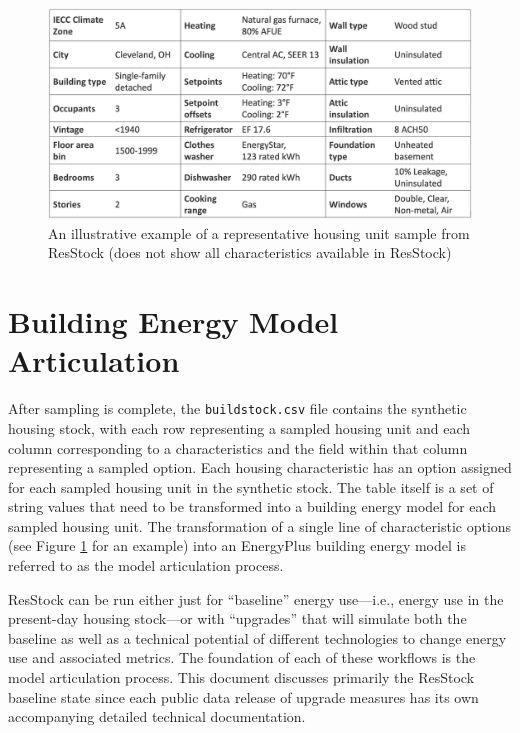 \begin{figure}
    \centering
    \includegraphics[width=1\linewidth]{images/illustrative_sample.png}
    \caption{An illustrative example of a representative housing unit sample from ResStock (does not show all characteristics available in ResStock)}
    \label{fig:illustrative_sample}
\end{figure}

\section{Building Energy Model Articulation} \label{sec:bem_articulation}
After sampling is complete, the \texttt{buildstock.csv} file contains the synthetic housing stock, with each row representing a sampled housing unit and each column corresponding to a characteristics and the field within that column representing a sampled option. Each housing characteristic has an option assigned for each sampled housing unit in the synthetic stock. The table itself is a set of string values that need to be transformed into a building energy model for each sampled housing unit. The transformation of a single line of characteristic options (see Figure \ref{fig:illustrative_sample} for an example) into an EnergyPlus building energy model is referred to as the model articulation process.

ResStock can be run either just for ``baseline'' energy use---i.e., energy use in the present-day housing stock---or with ``upgrades'' that will simulate both the baseline as well as a technical potential of different technologies to change energy use and associated metrics. The foundation of each of these workflows is the model articulation process. This document discusses primarily the ResStock baseline state since each public data release of upgrade measures has its own accompanying detailed technical documentation. 

